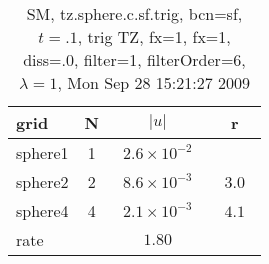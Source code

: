 \begin{table}[hbt]\tableFont %
\begin{center}
\begin{tabular}{|l|c|c|c|} \hline 
grid  & N &  $\vert u \vert$   & r \\ \hline 
             sphere1 &     1 & ~$2.6\times10^{ -2}$~ &            \\ \hline
             sphere2 &     2 & ~$8.6\times10^{ -3}$~ & ~$  3.0$~  \\ \hline
             sphere4 &     4 & ~$2.1\times10^{ -3}$~ & ~$  4.1$~  \\ \hline
    rate             &       &       $1.80$         &        \\ \hline
\end{tabular}
\caption{SM, tz.sphere.c.sf.trig, bcn=sf, $t=.1$, trig TZ, fx=1, fx=1, diss=.0, filter=1, filterOrder=6, $\lambda=1$, Mon Sep 28 15:21:27 2009}\label{table:tz.sphere.c.sf.trig}
\end{center}
\end{table}
